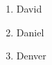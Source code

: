 \documentclass{article}
\begin{document}
	
	\begin{enumerate}
		\item David
		\item Daniel
		\item Denver
	\end{enumerate}
\end{document}
